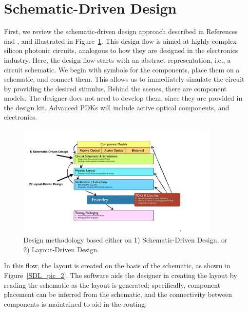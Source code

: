 \documentclass[journal]{spie}
\begin{document}
\section{Schematic-Driven Design}


First, we review the schematic-driven design approach described in References  and , and illustrated in Figure~\ref{SDDvsLDD}.   This design flow is aimed at highly-complex silicon photonic circuits, analogous to how they are designed in the electronics industry.  Here, the design flow starts with an abstract representation, i.e., a circuit schematic.  We begin with symbols for the components,  place them on a schematic, and connect them.   This allows us to immediately simulate the circuit by providing the desired stimulus.  Behind the scenes, there are component models.  The designer does not need to develop them, since they are provided in the design kit.  Advanced PDKs will include active optical components, and electronics.  

\begin{figure}[tbp]
	\centering
	\includegraphics[width=0.9\textwidth]{../figs_paper/SDDvsLDD.pdf}
    \caption[]{Design methodology based either on 1) Schematic-Driven Design, or 2) Layout-Driven Design.}
    \label{SDDvsLDD}
\end{figure}


In this flow, the layout is created on the basis of the schematic, as shown in Figure~\ref{SDL_pic_2}.  The software aids the designer in creating the layout by reading the schematic as the layout is generated; specifically, component placement can be inferred from the schematic, and the connectivity between components is maintained to aid in the routing.
\end{document}
